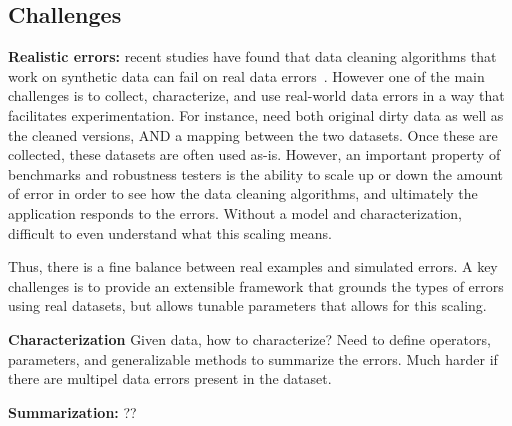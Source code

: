 \subsection{Challenges}

{\bf Realistic errors:} recent studies have found that data cleaning algorithms that work on synthetic data can fail on real data errors~\cite{mikecleaningexp}.  However one of the main challenges is to 
collect, characterize, and use real-world data errors in a way that facilitates experimentation.  For instance, need both original dirty data as well as the cleaned versions, AND a mapping between the two datasets.
Once these are collected, these datasets are often used as-is.  However, an important property of benchmarks and robustness testers is the ability to scale up or down the amount of error in order to see how the data cleaning algorithms, and ultimately the application responds to the errors.  Without a model and characterization, difficult to even understand what this scaling means.

Thus, there is a fine balance between real examples and simulated errors.  A key challenges is to provide an extensible framework that grounds the types of errors using real datasets, but allows tunable parameters that allows for this scaling.

{\bf Characterization}  Given data, how to characterize?  Need to define operators, parameters, and generalizable methods to summarize the errors.  Much harder if there are multipel data errors present in the dataset.

{\bf Summarization: } ??



